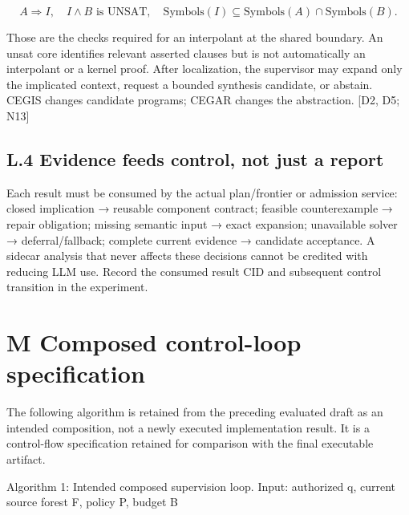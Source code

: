 \setcounter{equation}{5}
\begin{equation}
A\Rightarrow I,\quad I\land B\text{ is UNSAT},\quad\mathrm{Symbols}(I)\subseteq\mathrm{Symbols}(A)\cap\mathrm{Symbols}(B).
\tag{6}\end{equation}

Those are the checks required for an interpolant at the shared boundary. An unsat core identifies
relevant asserted clauses but is not automatically an interpolant or a kernel proof. After localization,
the supervisor may expand only the implicated context, request a bounded synthesis candidate, or
abstain. CEGIS changes candidate programs; CEGAR changes the abstraction. [D2, D5; N13]

\subsection*{L.4 Evidence feeds control, not just a report}

Each result must be consumed by the actual plan/frontier or admission service: closed implication →
reusable component contract; feasible counterexample → repair obligation; missing semantic input
→ exact expansion; unavailable solver → deferral/fallback; complete current evidence → candidate
acceptance. A sidecar analysis that never affects these decisions cannot be credited with reducing
LLM use. Record the consumed result CID and subsequent control transition in the experiment.




\section*{M Composed control-loop specification}
The following algorithm is retained from the preceding evaluated draft as an intended composition,
not a newly executed implementation result. It is a control-flow specification retained for comparison
with the final executable artifact.

Algorithm 1: Intended composed supervision loop. Input: authorized q, current source forest F,
policy P, budget B

